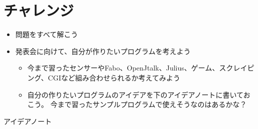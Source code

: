 
\clearpage
{}\label{P:challenge}
\section{チャレンジ}
\begin{itemize}
\item 問題をすべて解こう
\item
発表会に向けて、自分が作りたいプログラムを考えよう

\begin{itemize}
\item
今まで習ったセンサーやFabo、OpenJtalk、Julius、ゲーム、スクレイピング、CGIなど組み合わせられるか考えてみよう
\item
自分の作りたいプログラムのアイデアを下のアイデアノートに書いておこう。
		今まで習ったサンプルプログラムで使えそうなのはあるかな？
\end{itemize}
\end{itemize}
アイデアノート

% 	　　　　　　　　　　　　　　　　　　　　　　　　　

